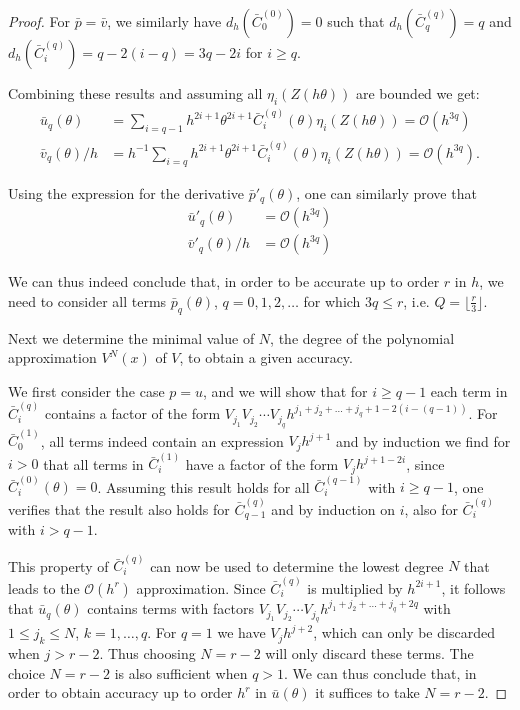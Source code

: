 \begin{proof}
    For $\bar{p}=\bar{v}$, we similarly have $d_h\left(\bar{C}_{0}^{(0)}\right)=0$ such that $d_h\left(\bar{C}_{q}^{(q)}\right)=q$ and $d_h\left(\bar{C}_{i}^{(q)}\right) = q-2(i-q)=3q-2i$ for $i \geq q$.

    Combining these results and assuming all $\eta_i(Z(h\theta))$ are bounded we get:
    \begin{align*}
        \bar{u}_{q}(\theta)   & =  \sum_{i=q-1} h^{2i+1} \theta^{2i+1} \bar{C}^{(q)}_i(\theta) \eta_{i}(Z(h\theta)) = \mathcal{O}(h^{3q})             \\
        \bar{v}_{q}(\theta)/h & = h^{-1} \sum_{i=q} h^{2i+1} \theta^{2i+1} \bar{C}^{(q)}_i(\theta) \eta_{i}(Z(h\theta)) = \mathcal{O}(h^{3q})\text{.}
    \end{align*}

    Using the expression for the derivative $\bar{p}'_{q}(\theta)$, one can similarly prove that
    \begin{align*}
        \bar{u}'_{q}(\theta)   & =  \mathcal{O}(h^{3q}) \\
        \bar{v}'_{q}(\theta)/h & = \mathcal{O}(h^{3q})
    \end{align*}

    We can thus indeed conclude that, in order to be accurate up to order $r$ in $h$, we need to consider all terms $\bar{p}_q(\theta)$, $q=0,1,2,\ldots$ for which $3q \leq r$, i.e. $Q= \lfloor \frac{r}{3} \rfloor$.

    Next we determine the minimal value of $N$, the degree of the polynomial approximation $V^{N}(x)$ of $V$, to obtain a given accuracy.

    We first consider the case $p=u$, and we will show that for $i \geq q-1$ each term in $\bar{C}_i^{(q)}$ contains a factor of the form $ V_{j_1} V_{j_2} \cdots V_{j_q} h^{j_1+j_2+\ldots+j_q+1 - 2 (i-(q-1))}$. For $\bar{C}_0^{(1)}$, all terms indeed contain an expression $V_j h^{j+1}$ and by induction we find for $i>0$ that all terms in $\bar{C}_i^{(1)}$ have a factor of the form $V_j h^{j+1-2i}$, since $\bar{C}_i^{(0)}(\theta)=0$. Assuming this result holds for all $\bar{C}_i^{(q-1)}$ with $i\geq q - 1$, one verifies that the result also holds for $\bar{C}_{q-1}^{(q)}$ and by induction on $i$, also for $\bar{C}_{i}^{(q)}$ with $i>q-1$.

    This property of $\bar{C}_i^{(q)}$ can now be used to determine the lowest degree $N$ that leads to the $\mathcal{O}(h^r)$ approximation. Since $\bar{C}_i^{(q)}$ is multiplied by $h^{2i+1}$, it follows that  $\bar{u}_q(\theta)$ contains terms with factors $ V_{j_1} V_{j_2} \cdots V_{j_q} h^{j_1+j_2+\ldots+j_q+ 2 q }$ with $1 \leq j_k \leq N$, $k=1,\ldots, q$. For $q=1$ we have $V_{j} h^{j+2} $, which can only be discarded when $j>r-2$. Thus choosing $N=r-2$ will only discard these terms. The choice $N=r-2$ is also sufficient when $q>1$. We can thus conclude that, in order to obtain accuracy up to order $h^r$ in $\bar{u}(\theta)$ it suffices to take $N=r-2$.


\end{proof}
